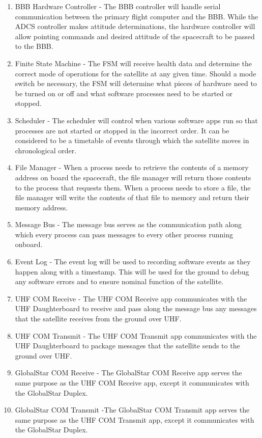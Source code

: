 \documentclass{article}
\begin{document}
\begin{enumerate}
\item BBB Hardware Controller - The BBB controller will handle serial communication between the primary flight computer and the BBB. While the ADCS controller makes attitude determinations, the hardware controller will allow pointing commands and desired attitude of the spacecraft to be passed to the BBB.
\item Finite State Machine - The FSM will receive health data and determine the correct mode of operations for the satellite at any given time. Should a mode switch be necessary, the FSM will determine what pieces of hardware need to be turned on or off and what software processes need to be started or stopped.
\item Scheduler - The scheduler will control when various software apps run so that processes are not started or stopped in the incorrect order. It can be considered to be a timetable of events through which the satellite moves in chronological order.
\item File Manager - When a process needs to retrieve the contents of a memory address on board the spacecraft, the file manager will return those contents to the process that requests them. When a process needs to store a file, the file manager will write the contents of that file to memory and return their memory address.
\item Message Bus - The message bus serves as the communication path along which every process can pass messages to every other process running onboard.
\item Event Log - The event log will be used to recording software events as they happen along with a timestamp. This will be used for the ground to debug any software errors and to ensure nominal function of the satellite.
\item UHF COM Receive - The UHF COM Receive app communicates with the UHF Daughterboard to receive and pass along the message bus any messages that the satellite receives from the ground over UHF.
\item UHF COM Transmit - The UHF COM Transmit app communicates with the UHF Daughterboard to package messages that the satellite sends to the ground over UHF.
\item GlobalStar COM Receive - The GlobalStar COM Receive app serves the same purpose as the UHF COM Receive app, except it communicates with the GlobalStar Duplex.
\item GlobalStar COM Transmit -The GlobalStar COM Transmit app serves the same purpose as the UHF COM Transmit app, except it communicates with the GlobalStar Duplex.
\end{enumerate}
\end{document}

